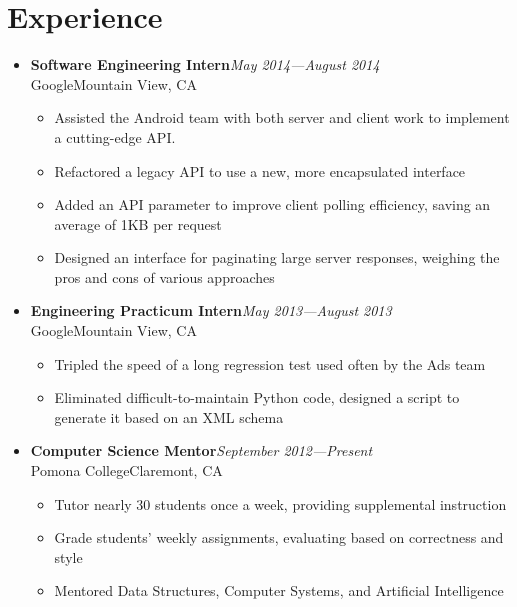 \documentclass[10pt]{article}
\newcommand\experienceentry[4]{{
        \textbf{#3}\hfill\textit{#4} \\
        #1\hfill#2
}}
\begin{document}
\section*{Experience}
\begin{itemize}[label=,leftmargin=0]
    \item \experienceentry{Google}{Mountain View, CA}
        {Software Engineering Intern}{May 2014---August 2014}
        \begin{itemize}[topsep=4pt]
            \item Assisted the Android team with both server and client work to
                implement a cutting-edge API\@.
            \item Refactored a legacy API to use a new, more encapsulated
                interface
            \item Added an API parameter to improve client polling
                efficiency, saving an average of 1KB per request
            \item Designed an interface for paginating large server responses,
                weighing the pros and cons of various approaches
        \end{itemize}
    \item \experienceentry{Google}{Mountain View, CA}
        {Engineering Practicum Intern}{May 2013---August 2013}
        \begin{itemize}[topsep=4pt]
            \item Tripled the speed of a long regression test used often by the
                Ads team
            \item Eliminated difficult-to-maintain Python code, designed a script
                to generate it based on an XML schema
        \end{itemize}

    \item \experienceentry{Pomona College}{Claremont, CA}
        {Computer Science Mentor}{September 2012---Present}
        \begin{itemize}[topsep=4pt]
            \item Tutor nearly 30 students once a week, providing supplemental
                instruction
            \item Grade students' weekly assignments, evaluating
                based on correctness and style
            \item Mentored Data Structures, Computer Systems, and Artificial
                Intelligence
        \end{itemize}
\end{itemize}
\end{document}
